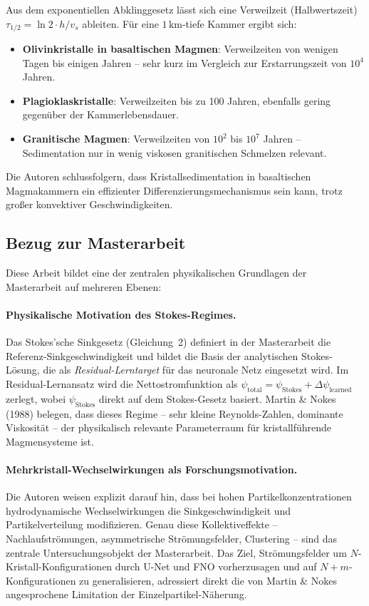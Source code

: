 \documentclass[a4paper,12pt]{article}
\begin{document}
Aus dem exponentiellen Abklinggesetz lässt sich eine Verweilzeit (Halbwertszeit)
$\tau_{1/2} = \ln 2 \cdot h / v_s$ ableiten. Für eine $1\,\text{km}$-tiefe
Kammer ergibt sich:
\begin{itemize}
    \item \textbf{Olivinkristalle in basaltischen Magmen}: Verweilzeiten von
    wenigen Tagen bis einigen Jahren -- sehr kurz im Vergleich zur
    Erstarrungszeit von $10^4$ Jahren.
    \item \textbf{Plagioklaskristalle}: Verweilzeiten bis zu 100 Jahren, ebenfalls
    gering gegenüber der Kammerlebensdauer.
    \item \textbf{Granitische Magmen}: Verweilzeiten von $10^2$ bis $10^7$
    Jahren -- Sedimentation nur in wenig viskosen granitischen Schmelzen
    relevant.
\end{itemize}
Die Autoren schlussfolgern, dass Kristallsedimentation in basaltischen
Magmakammern ein effizienter Differenzierungsmechanismus sein kann, trotz großer
konvektiver Geschwindigkeiten.

\subsection*{Bezug zur Masterarbeit}

Diese Arbeit bildet eine der zentralen physikalischen Grundlagen der
Masterarbeit auf mehreren Ebenen:

\paragraph{Physikalische Motivation des Stokes-Regimes.}
Das Stokes'sche Sinkgesetz (Gleichung~2) definiert in der Masterarbeit die
Referenz-Sinkgeschwindigkeit und bildet die Basis der analytischen
Stokes-Lösung, die als \emph{Residual-Lerntarget} für das neuronale Netz
eingesetzt wird. Im Residual-Lernansatz wird die Nettostromfunktion als
$\psi_\mathrm{total} = \psi_\mathrm{Stokes} + \Delta\psi_\mathrm{learned}$
zerlegt, wobei $\psi_\mathrm{Stokes}$ direkt auf dem Stokes-Gesetz basiert.
Martin \& Nokes (1988) belegen, dass dieses Regime -- sehr kleine
Reynolds-Zahlen, dominante Viskosität -- der physikalisch relevante
Parameterraum für kristallführende Magmensysteme ist.

\paragraph{Mehrkristall-Wechselwirkungen als Forschungsmotivation.}
Die Autoren weisen explizit darauf hin, dass bei hohen Partikelkonzentrationen
hydrodynamische Wechselwirkungen die Sinkgeschwindigkeit und Partikelverteilung
modifizieren. Genau diese Kollektiveffekte -- Nachlaufströmungen, asymmetrische
Strömungsfelder, Clustering -- sind das zentrale Untersuchungsobjekt der
Masterarbeit. Das Ziel, Strömungsfelder um $N$-Kristall-Konfigurationen durch
U-Net und FNO vorherzusagen und auf $N{+}m$-Konfigurationen zu generalisieren,
adressiert direkt die von Martin \& Nokes angesprochene Limitation der
Einzel\-partikel-Näherung.
\end{document}
